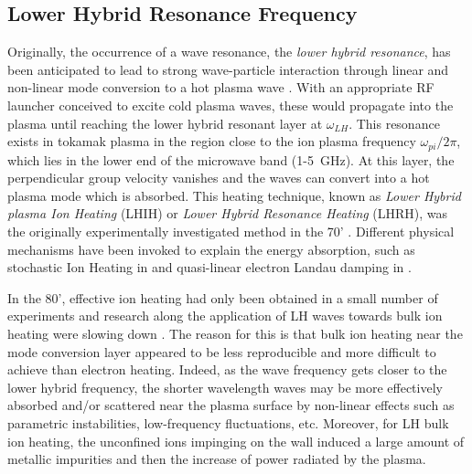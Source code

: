 \subsection{Lower Hybrid Resonance Frequency}
Originally, the occurrence of a wave resonance, the \emph{lower hybrid resonance}, has been anticipated to lead to strong wave-particle interaction through linear and non-linear mode conversion to a hot plasma wave . With an appropriate RF launcher conceived to excite cold plasma waves, these would propagate into the plasma until reaching the lower hybrid resonant layer at $\omega_{LH}$. This resonance exists in tokamak plasma in the region close to the ion plasma frequency $\omega_{pi}/2\pi$, which lies in the lower end of the microwave band (1-5~GHz). At this layer, the perpendicular group velocity vanishes and the waves can convert into a hot plasma mode which is absorbed. This heating technique, known as \emph{Lower Hybrid plasma Ion Heating} (LHIH) or \emph{Lower Hybrid Resonance Heating} (LHRH), was the originally experimentally investigated method in the 70' . Different physical mechanisms have been invoked to explain the energy absorption, such as stochastic Ion Heating in  and quasi-linear electron Landau damping in  .


In the 80', effective ion heating had only been obtained in a small number of experiments and research along the application of LH waves towards bulk ion heating were slowing down . The reason for this is that bulk ion heating near the mode conversion layer appeared to be less reproducible and more difficult to achieve than electron heating. Indeed, as the wave frequency gets closer to the lower hybrid frequency, the shorter wavelength waves may be more effectively absorbed and/or scattered near the plasma surface by non-linear effects such as parametric instabilities, low-frequency fluctuations, etc. Moreover, for LH bulk ion heating, the unconfined ions impinging on the wall induced a large amount of metallic impurities and then the increase of power radiated by the plasma.

